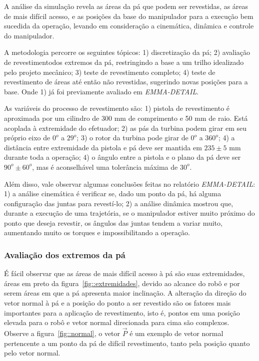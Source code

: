 A análise da simulação revela as áreas da pá que podem ser revestidas,
as áreas de mais difícil acesso, e as posições da base do manipulador para a
execução bem sucedida da operação, levando em consideração a cinemática,
dinâmica e controle do manipulador. 

A metodologia percorre os seguintes tópicos: 1) discretização da pá; 2)
avaliação de revestimentodos extremos da pá, restringindo a base a um trilho
idealizado pelo projeto mecânico; 3) teste de revestimento completo; 4) teste de
revestimento de áreas até então não revestidas, sugerindo novas posições para a
base. Onde 1) já foi previamente avaliado em \textit{EMMA-DETAIL}. 

As variáveis do processo de revestimento são: 1) pistola de revestimento
é aproximada por um cilindro de 300 mm de comprimento e 50 mm de raio. Está
acoplada à extremidade do efetuador; 2) as pás da turbina podem girar em seu
próprio eixo de $0^o$ a $29^o$; 3) o rotor da turbina pode girar de
$0^o$ a $360^o$; 4) a distância entre extremidade da pistola e pá deve
ser mantida em $235 \pm 5$ mm durante toda a operação; 4) o ângulo entre a
pistola e o plano da pá deve ser $90^o \pm 60^o$, mas é aconselhável uma
tolerância máxima de $30^o$.

Além disso, vale observar algumas conclusões feitas no relatório
\textit{EMMA-DETAIL}: 1) a análise cinemática é verificar se, dado um ponto da
pá, há alguma configuração das juntas para revestí-lo; 2) a análise dinâmica
mostrou que, durante a execução de uma trajetória, se o manipulador estiver
muito próximo do ponto que deseja revestir, os ângulos das juntas tendem a
variar muito, aumentando muito os torques e impossibilitando a operação.


\subsubsection{Avaliação dos extremos da pá} 

É fácil observar que as áreas de mais difícil acesso à pá são suas extremidades,
áreas em preto da figura~\ref{fig::extremidades}, devido ao alcance do robô e
por serem áreas em que a pá apresenta maior inclinação. A alteração da direção
do vetor normal à pá e a posição do ponto a ser revestido são os fatores mais
importantes para a aplicação de revestimento, isto é, pontos em uma posição
elevada para o robô e vetor normal direcionada para cima são complexos. Observe
a figura~\ref{fig::normal}, o vetor $\vec{P}$ é um exemplo de vetor normal
pertencente a um ponto da pá de difícil revestimento, tanto pela posição quanto
pelo vetor normal.

